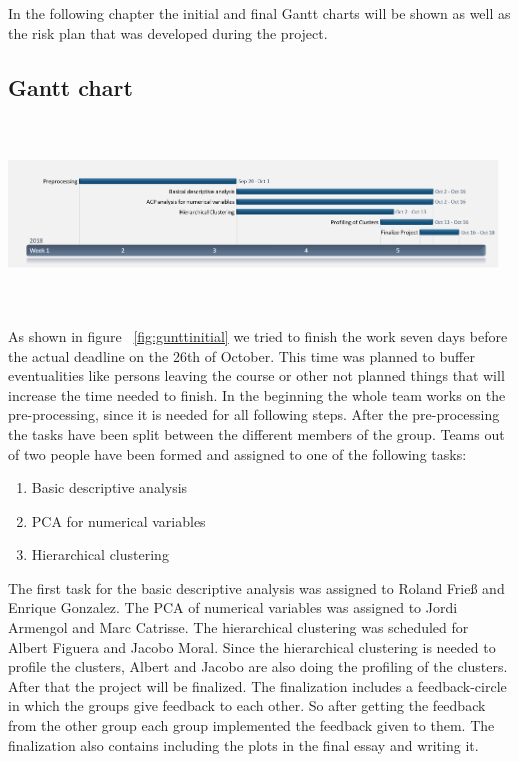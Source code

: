 


In the following chapter the initial and final Gantt charts will be shown as well as the risk plan that was developed during the project. 
\subsection{Gantt chart}
\begin{center}
  \includegraphics[height=5cm, width=13cm]{images/initial_guntt_chart.png}
  \label{fig:gunttinitial}
\end{center}
As shown in figure ~\ref{fig:gunttinitial} we tried to finish the work seven days before the actual deadline on the 26th of October. This time was planned to buffer eventualities like persons leaving the course or other not planned things that will increase the time needed to finish. In the beginning the whole team works on the pre-processing, since it is needed for all following steps. After the pre-processing the tasks have been split between the different members of the group. Teams out of two people have been formed and assigned to one of the following tasks:
\begin{enumerate}
\item Basic descriptive analysis
\item PCA for numerical variables
\item Hierarchical clustering
\end{enumerate}
The first task for the basic descriptive analysis was assigned to Roland Frieß and Enrique Gonzalez. The PCA of numerical variables was assigned to Jordi Armengol and Marc Catrisse. The hierarchical clustering was scheduled for Albert Figuera and Jacobo Moral. Since the hierarchical clustering is needed to profile the clusters, Albert and Jacobo are also doing the profiling of the clusters. After that the project will be finalized. The finalization includes a feedback-circle in which the groups give feedback to each other. So after getting the feedback from the other group each group implemented the feedback given to them. The finalization also contains including the plots in the final essay and writing it. 



